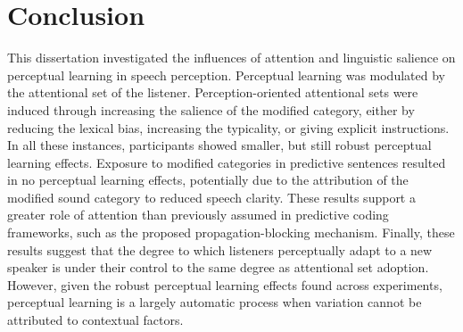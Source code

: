 

\section{Conclusion}

This dissertation investigated the influences of attention and linguistic salience on perceptual learning in speech perception.
Perceptual learning was modulated by the attentional set of the listener.
Perception-oriented attentional sets were induced through increasing the salience of the modified category, either by reducing the lexical bias, increasing the typicality, or giving explicit instructions.
In all these instances, participants showed smaller, but still robust perceptual learning effects.
Exposure to modified categories in predictive sentences resulted in no perceptual learning effects, potentially due to the attribution of the modified sound category to reduced speech clarity.
These results support a greater role of attention than previously assumed in predictive coding frameworks, such as the proposed propagation-blocking mechanism.
Finally, these results suggest that the degree to which listeners perceptually adapt to a new speaker is under their control to the same degree as attentional set adoption.
However, given the robust perceptual learning effects found across experiments, perceptual learning is a largely automatic process when variation cannot be attributed to contextual factors.


